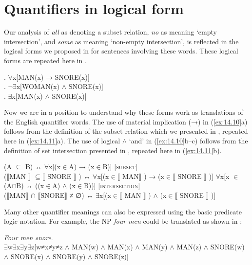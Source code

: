 \section{Quantifiers in logical form}\label{sec:14.3}

Our analysis of \textit{all} as denoting a subset relation, \textit{no} as meaning ‘empty intersection’, and \textit{some} as meaning ‘non-empty intersection’, is reflected in the logical forms we proposed in  for sentences involving these words. These logical forms are repeated here in .


\ea \label{ex:14.10}
.  ${\forall}$x[MAN(x) → SNORE(x)]\\
.  ${\lnot}$${\exists}$x[WOMAN(x) $\wedge$ SNORE(x)]\\
.  ${\exists}$x[MAN(x) $\wedge$ SNORE(x)]
                       \z
\z


Now we are in a position to understand why these forms work as translations of the English quantifier words. The use of material implication (→) in (\ref{ex:14.10}a) follows from the definition of the subset relation which we presented in , repeated here in (\ref{ex:14.11}a). The use of logical $\wedge$ ‘and’ in (\ref{ex:14.10}b--c) follows from the definition of set intersection presented in , repeated here in (\ref{ex:14.11}b).


\ea \label{ex:14.11}
\ea 
\small
(A ${\subseteq}$ B)  ↔   ${\forall}$x[(x${\in}$A) → (x${\in}$B)]  \hfill [\textsc{subset}] \\
  ($\llbracket$MAN $\rrbracket$  ${\subseteq} \llbracket$ SNORE $\rrbracket$ )  ↔   ${\forall}$x[(x${\in}\llbracket$ MAN$\rrbracket$ ) → (x${\in}\llbracket$ SNORE $\rrbracket$ )]
\ex 
\small
${\forall}$x[x ${\in}$ (A${\cap}$B)  ↔   ((x${\in}$A) $\wedge$ (x${\in}$B))]  \hfill [\textsc{intersection}] \\
  ($\llbracket$MAN$\rrbracket$ ${\cap}$ $\llbracket$SNORE$\rrbracket$  ≠ ∅) ↔   ${\exists}$x[(x${\in}\llbracket$ MAN $\rrbracket$ ) $\wedge$ (x${\in} \llbracket$  SNORE $\rrbracket$ )]
\z \z
\normalsize

Many other quantifier meanings can also be expressed using the basic predicate logic notation. For example, the NP \textit{four men} could be translated as shown in :


\ea \label{ex:14.12}
\textit{Four men snore}.\\
${\exists}$w${\exists}$x${\exists}$y${\exists}$z[w≠x≠y≠z $\wedge$ MAN(w) $\wedge$ MAN(x) $\wedge$ MAN(y) $\wedge$ MAN(z) $\wedge$ SNORE(w) $\wedge$ SNORE(x) $\wedge$ SNORE(y) $\wedge$ SNORE(z)]
\z


